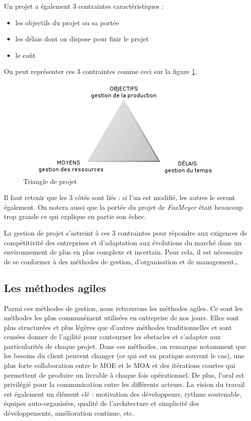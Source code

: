 \documentclass[12pt]{report}
\begin{document}
Un projet a également 3 contraintes caractéristiques :
\begin{itemize}
\item les objectifs du projet ou sa portée
\item les délais dont on dispose pour finir le projet
\item le coût
\end{itemize}

On peut représenter ces 3 contraintes comme ceci sur la figure \ref{fig:trg}.
\begin{figure}[htp]
  \centering
  \includegraphics[scale=0.8]{images/triangle_projet}
  \caption{Triangle de projet}
  \label{fig:trg}
\end{figure}

Il faut retenir que les 3 côtés sont liés : si l'un est modifié, les autres le seront également. On notera aussi que la portée du projet de \textit{FoxMeyer} était beaucoup trop grande ce qui explique en partie son échec.

La gestion de projet s’astreint à ces 3 contraintes pour répondre aux exigences de compétitivité des entreprises et d’adaptation aux évolutions du marché dans un environnement de plus en plus complexe et incertain. Pour cela, il est nécessaire de se conformer à des méthodes de gestion, d'organisation et de management…

\subsection{Les méthodes agiles}

Parmi ces méthodes de gestion, nous retrouvons les méthodes agiles. Ce sont les méthodes les plus communément utilisées en entreprise de nos jours.
Elles sont plus structurées et plus légères que d'autres méthodes traditionnelles et sont censées donner de l'agilité pour contourner les obstacles et s'adapter aux particularités de chaque projet.
Dans ces méthodes, on remarque notamment que les besoins du client peuvent changer (ce qui est en pratique souvent le cas), une plus forte collaboration entre le MOE et le MOA et des itérations courtes qui permettent de produire un livrable à chaque fois opérationnel. De plus, l'oral  est privilégié pour la communication entre les différents acteurs.
La vision du travail est également un élément clé : motivation des développeurs, rythme soutenable, équipes auto-organisées, qualité de l'architecture et simplicité des développements, amélioration continue, etc.
\end{document}
